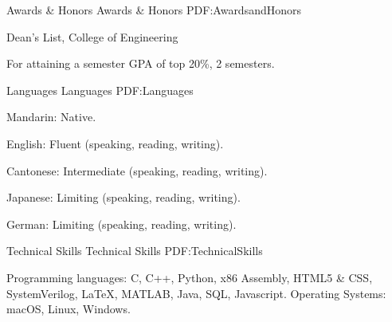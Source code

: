 \documentclass[letterpaper,MMMyyyy,nonstopmode]{simpleresumecv}
\begin{document}
\begin{Body}

\Section
{Awards \& Honors}
{Awards \& Honors}
{PDF:AwardsandHonors}

\BulletItem
Dean's List,
College of Engineering
\hfill
\begin{Detail}
\Item
For attaining a semester GPA of top 20\%, 2 semesters.
\end{Detail}


\Section
{Languages}
{Languages}
{PDF:Languages}

\BulletItem
Mandarin: Native.

\Gap
\BulletItem
English: Fluent (speaking, reading, writing).

\Gap
\BulletItem
Cantonese: Intermediate (speaking, reading, writing).

\Gap
\BulletItem
Japanese: Limiting (speaking, reading, writing).

\Gap
\BulletItem
German: Limiting (speaking, reading, writing).


\Section
{Technical Skills}
{Technical Skills}
{PDF:TechnicalSkills}

\Entry
\BulletItem
Programming languages: C, C++, Python, x86 Assembly, HTML5 \& CSS, SystemVerilog, {\LaTeX}, MATLAB,  Java, SQL, Javascript.
\BulletItem
Operating Systems: macOS, Linux, Windows.

\end{Body}
\end{document}
